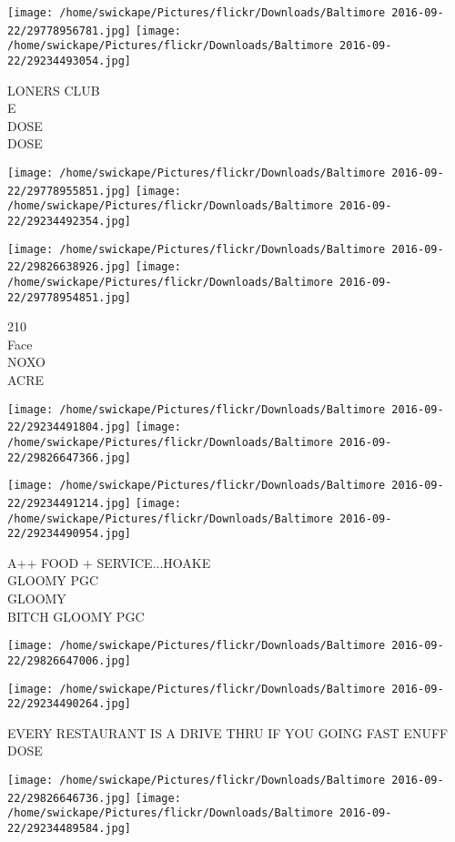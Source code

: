 \documentclass[10pt,letterpaper]{article}
\begin{document}
\texttt{[image: /home/swickape/Pictures/flickr/Downloads/Baltimore 2016-09-22/29778956781.jpg]}
\texttt{[image: /home/swickape/Pictures/flickr/Downloads/Baltimore 2016-09-22/29234493054.jpg]}

LONERS CLUB\\
E\\
DOSE\\
DOSE
\pagebreak

\texttt{[image: /home/swickape/Pictures/flickr/Downloads/Baltimore 2016-09-22/29778955851.jpg]}
\texttt{[image: /home/swickape/Pictures/flickr/Downloads/Baltimore 2016-09-22/29234492354.jpg]}

\texttt{[image: /home/swickape/Pictures/flickr/Downloads/Baltimore 2016-09-22/29826638926.jpg]}
\texttt{[image: /home/swickape/Pictures/flickr/Downloads/Baltimore 2016-09-22/29778954851.jpg]}

210\\
Face\\
NOXO\\
ACRE
\pagebreak

\texttt{[image: /home/swickape/Pictures/flickr/Downloads/Baltimore 2016-09-22/29234491804.jpg]}
\texttt{[image: /home/swickape/Pictures/flickr/Downloads/Baltimore 2016-09-22/29826647366.jpg]}

\texttt{[image: /home/swickape/Pictures/flickr/Downloads/Baltimore 2016-09-22/29234491214.jpg]}
\texttt{[image: /home/swickape/Pictures/flickr/Downloads/Baltimore 2016-09-22/29234490954.jpg]}

A++ FOOD + SERVICE...HOAKE\\
GLOOMY PGC\\
GLOOMY\\
BITCH GLOOMY PGC
\pagebreak

\texttt{[image: /home/swickape/Pictures/flickr/Downloads/Baltimore 2016-09-22/29826647006.jpg]}

\vspace{0.25in}
\texttt{[image: /home/swickape/Pictures/flickr/Downloads/Baltimore 2016-09-22/29234490264.jpg]}

EVERY RESTAURANT IS A DRIVE THRU IF YOU GOING FAST ENUFF\\
DOSE
\pagebreak

\texttt{[image: /home/swickape/Pictures/flickr/Downloads/Baltimore 2016-09-22/29826646736.jpg]}
\texttt{[image: /home/swickape/Pictures/flickr/Downloads/Baltimore 2016-09-22/29234489584.jpg]}
\end{document}
